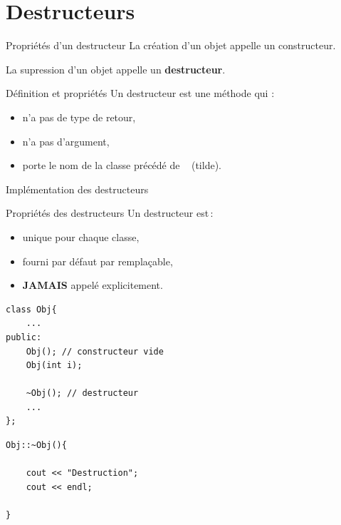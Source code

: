 \section{Destructeurs}

\begin{frame}{Propriétés d'un destructeur}
    La création d'un objet appelle un constructeur.
    
    La supression d'un objet appelle un \textbf{destructeur}.

    \begin{block}{Définition et propriétés}
    Un destructeur est une méthode qui :
    \begin{itemize}
        \item n'a pas de type de retour,
        \item n'a pas d'argument,
        \item porte le nom de la classe précédé de \texttt{~} (tilde).
    \end{itemize}
    \end{block}
\end{frame}

\begin{frame}[fragile=singleslide]{Implémentation des destructeurs}
    \begin{block}{Propriétés des destructeurs}
    Un destructeur est\,:
    \begin{itemize}
        \item unique pour chaque classe,
        \item fourni par défaut par remplaçable,
        \item \textbf{JAMAIS} appelé explicitement.
    \end{itemize}
    \end{block}

    \begin{minipage}{0.48\linewidth}
            \begin{verbatim}
class Obj{
    ...
public:
    Obj(); // constructeur vide
    Obj(int i);

    ~Obj(); // destructeur
    ...
};
            \end{verbatim}
    \end{minipage}
    \hfill
    \begin{minipage}{0.50\linewidth}
            \begin{verbatim}
Obj::~Obj(){

    cout << "Destruction";
    cout << endl;

}
            \end{verbatim}
    \end{minipage}
\end{frame}

